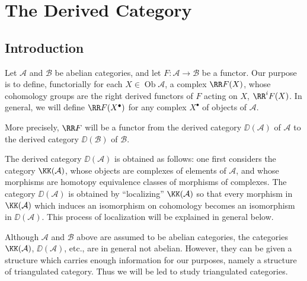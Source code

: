 \chapter{The Derived Category}

\setcounter{section}{-1}
\section{Introduction}\label{sec:1.0}
Let $\mathcal{A}$ and $\mathcal{B}$ be abelian categories, and let $F\colon \mathcal{A}\to\mathcal{B}$ be a functor. Our purpose is to define, functorially for each $X\in\operatorname{Ob}\mathcal{A}$, a complex $\RR F(X)$, whose cohomology groups are the right derived functors of $F$ acting on $X$, $\RR^iF(X)$. In general, we will define $\RR F(X^\bullet)$ for any complex $X^\bullet$ of objects of $\mathcal{A}$.

More precisely, $\RR F$ will be a functor from the derived category $\DD(\mathcal{A})$ of $\mathcal{A}$ to the derived category $\DD(\mathcal{B})$ of $\mathcal{B}$.

The derived category $\DD(\mathcal{A})$ is obtained as follows: one first considers the category $\KK(\mathcal{A})$, whose objects are complexes of elements of $\mathcal{A}$, and whose morphisms are homotopy equivalence classes of morphisms of complexes. The category $\DD(\mathcal{A})$ is obtained by ``localizing'' $\KK(\mathcal{A})$ so that every morphism in $\KK(\mathcal{A})$ which induces an isomorphism on cohomology becomes an isomorphism in $\DD(\mathcal{A})$. This process of localization will be explained in general below.

Although $\mathcal{A}$ and $\mathcal{B}$ above are assumed to be abelian categories, the categories $\KK(\mathcal{A})$, $\DD(\mathcal{A})$, etc., are in general not abelian. However, they can be given a structure which carries enough information for our purposes, namely a structure of triangulated category. Thus we will be led to study triangulated categories.

